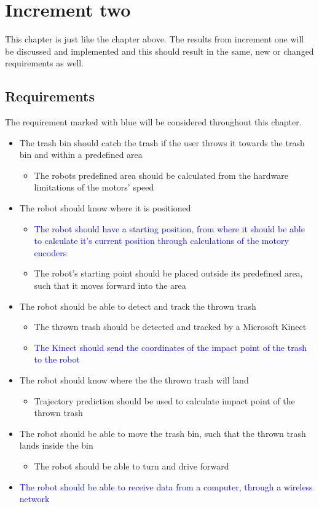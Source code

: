 \chapter{Increment two}
\label{chap:Increment two}
This chapter is just like the chapter above. The results from increment one will be discussed and implemented and this should result in the same, new or changed requirements as well.  

\section{Requirements}
\label{sec:i2Requirements}
The requirement marked with blue will be considered throughout this chapter.

\begin{itemize}
	\item The trash bin should catch the trash if the user throws it towards the trash bin and within a predefined area
	\begin{itemize}
		\item {The robots predefined area should be calculated from the hardware limitations of the motors’ speed}
	\end{itemize}
	\item The robot should know where it is positioned
	\begin{itemize}
		\item \textcolor{blue}{The robot should have a starting position, from where it should be able to calculate it's current position through calculations of the motory encoders}
		\item {The robot's starting point should be placed outside its predefined area, such that it moves forward into the area}
	\end{itemize}
	\item The robot should be able to detect and track the thrown trash
	\begin{itemize}
		\item {The thrown trash should be detected and tracked by a Microsoft Kinect}
		\item \textcolor{blue}{The Kinect should send the coordinates of the impact point of the trash to the robot}
	\end{itemize}
	\item The robot should know where the the thrown trash will land
	\begin{itemize}
		\item {Trajectory prediction should be used to calculate impact point of the thrown trash}
	\end{itemize}
	\item The robot should be able to move the trash bin, such that the thrown trash lands inside the bin
	\begin{itemize}
		\item {The robot should be able to turn and drive forward}
	\end{itemize}
	\item \textcolor{blue}{The robot should be able to receive data from a computer, through a wireless network}
\end{itemize}


